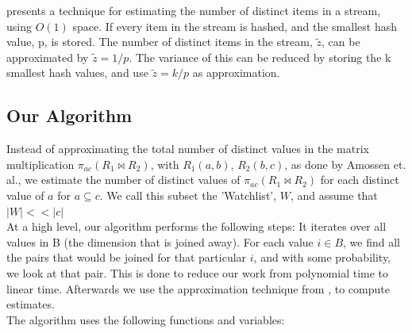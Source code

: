 \documentclass[a4paper,11pt]{article}
\begin{document}
\cite{paper:bar-yos} presents a technique for estimating the number of distinct items in a stream, using $O(1)$ space. If every item in the stream is hashed, and the smallest hash value, p, is stored. The number of distinct items in the stream, $\tilde{z}$, can be approximated by $\tilde{z}=1/p$. The variance of this can be reduced by storing the k smallest hash values, and use $\tilde{z}=k/p$ as approximation.\\

\subsection{Our Algorithm}
\label{subsub:alg}
Instead of approximating the total number of distinct values in the matrix multiplication $\pi_{ac}(R_1 \Join R_2)$, with $R_1(a,b)$, $R_2(b,c)$, as done by Amossen et. al., we estimate the number of distinct values of $\pi_{ac}(R_1 \Join R_2)$ for each distinct value of $a$ for $a \subseteq c$. We call this subset the 'Watchlist', $W$, and assume that $|W| << |c|$ \\
At a high level, our algorithm performs the following steps: It iterates over all values in B (the dimension that is joined away). For each value $i \in B$, we find all the pairs that would be joined for that particular $i$, and with some probability, we look at that pair. This is done to reduce our work from polynomial time to linear time. Afterwards we use the approximation technique from \cite{paper:bar-yos}, to compute estimates.\\

The algorithm uses the following functions and variables:
\end{document}
